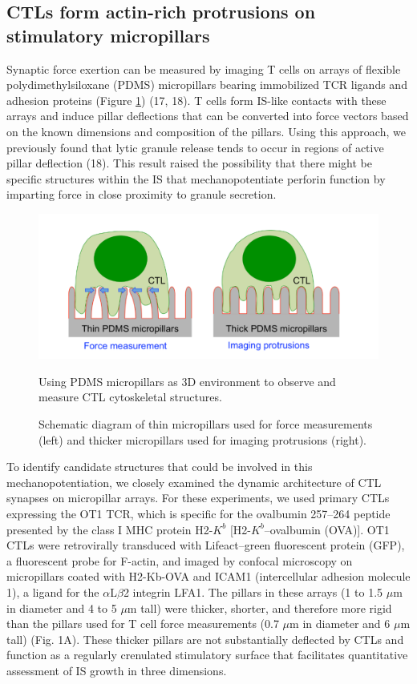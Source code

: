 \subsection{CTLs form actin-rich protrusions on stimulatory micropillars}
Synaptic force exertion can be measured by imaging T cells on arrays of flexible polydimethylsiloxane (PDMS) micropillars bearing immobilized TCR ligands and adhesion proteins (Figure \ref{fig:fig1pillarscartoon}) (17, 18). T cells form IS-like contacts with these arrays and induce pillar deflections that can be converted into force vectors based on the known dimensions and composition of the pillars. Using this approach, we previously found that lytic granule release tends to occur in regions of active pillar deflection (18). This result raised the possibility that there might be specific structures within the IS that mechanopotentiate perforin function by imparting force in close proximity to granule secretion.

\begin{figure}[htbp]
	\centering
	\includegraphics[width=\textwidth]{../figures/chapter2/fig1pillarscartoon.png}
	\caption{Using PDMS micropillars as 3D environment to observe and measure CTL cytoskeletal structures.}
	\caption*{Schematic diagram of thin micropillars used for force measurements (left) and thicker micropillars used for imaging protrusions (right).}
	\label{fig:fig1pillarscartoon}
\end{figure}

To identify candidate structures that could be involved in this mechanopotentiation, we closely examined the dynamic architecture of CTL synapses on micropillar arrays. For these experiments, we used primary CTLs expressing the OT1 TCR, which is specific for the ovalbumin 257–264 peptide presented by the class I MHC protein H2-$K^{b}$ [H2-$K^{b}$–ovalbumin (OVA)]. OT1 CTLs were retrovirally transduced with Lifeact–green fluorescent protein (GFP), a fluorescent probe for F-actin, and imaged by confocal microscopy on micropillars coated with H2-Kb-OVA and ICAM1 (intercellular adhesion molecule 1), a ligand for the $\alpha$L$\beta$2 integrin LFA1. The pillars in these arrays (1 to 1.5 $\mu$m in diameter and 4 to 5 $\mu$m tall) were thicker, shorter, and therefore more rigid than the pillars used for T cell force measurements (0.7 $\mu$m in diameter and 6 $\mu$m tall) (Fig. 1A). These thicker pillars are not substantially deflected by CTLs and function as a regularly crenulated stimulatory surface that facilitates quantitative assessment of IS growth in three dimensions.


